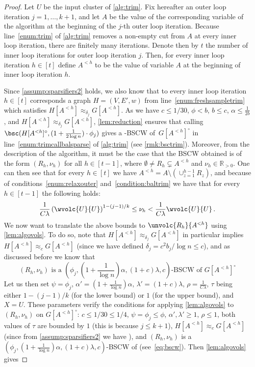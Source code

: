 \begin{proof}
	Let $U$ be the input cluster of \cref{alg:trim}. Fix hereafter an outer loop iteration $j=1,\dots, k+1$, and let $A$ be the value of the corresponding variable of the algorithm at the beginning of the $j$-th outer loop iteration. Because line~\eqref{enum:trim} of \cref{alg:trim} removes a non-empty cut from $A$ at every inner loop iteration, there are finitely many iterations. Denote then by $t$ the number of inner loop iterations for outer loop iteration $j$. Then, for every  inner loop iteration $h\in [t]$ define $A^{<h}$ to be the value of variable $A$ at the beginning of inner loop iteration $h$.
	
	Since \cref{assump:sparsifiers2} holds,  we also know that to every inner loop iteration $h \in [t]$ corresponds a graph $H=(V,E',w)$ from line~\eqref{enum:freshsampletrim} which satisfies $H[A^{<h}] \approx_{\delta_j} G[A^{<h}]$. As we have $c \le 1/30$, $\phi < b$, $b \le c$, $\alpha \le \frac{1}{2b}$,  and $H[A^{<h}] \approx_{\delta_j} G[A^{<h}]$, \cref{lem:reduction} ensures that calling $\bsc(H[A^{<h}]^\circ, (1+\frac{1}{2\log n}) \cdot \phi_j)$ gives a -BSCW of~$G[A^{<h}]^\circ$ in line~\eqref{enum:trimcallbalsparse} of \cref{alg:trim} (see \cref{rmk:bsctrim}). Moreover, from the description of the algorithm, it must be the case that the BSCW obtained is of the form $(R_h,\nu_h)$ for all $h \in [t-1]$, where $\emptyset \neq R_h \subsetneq A^{<h}$ and $\nu_h \in \mathbb{R}_{> 0}$. One can then see that for every $h \in [t]$ we have $A^{<h}=A \setminus (\cup_{z=1}^{h-1}R_z)$, and because of conditions~\eqref{enum:relaxouter} and~\eqref{condition:baltrim} we have that for every $h \in [t-1]$ the following holds:
	\begin{equation*}
		\frac{1}{C\lambda}\left(\wvolc{U}{U}\right)^{1-(j-1)/k} \le \nu_h < \frac{1}{C\lambda}\wvolc{U}{U} \, .
	\end{equation*}
	We now want to translate the above bounds to $\unvolc{R_h}{A^{<h}}$ using \cref{lem:algovols}. To do so, note that $H[A^{<h}] \approx_{\delta_j} G[A^{<h}]$ in particular implies $H[A^{<h}] \approx_{c} G[A^{<h}]$ (since we have defined $\delta_j=c^2 b_j/\log n \le c$), and as discussed before we know that
	\begin{equation}
		\label{eq:bscw}
		\text{$(R_h,\nu_h)$ is a $\left(\phi_j,\left(1+\frac{1}{\log n}\right)\alpha,(1+c)\lambda,c\right)$-BSCW of~$G[A^{<h}]^\circ$}
	\end{equation}
	Let us then set $\psi=\phi_j$, $ \alpha'=(1+\frac{1}{\log n})\alpha$, $\lambda' =(1+c)\lambda$, $\rho = \frac{1}{C\lambda}$, $\tau$ being either $1-(j-1)/k$ (for the lower bound) or $1$ (for the upper bound), and $X=U$. These parameters verify the conditions for applying \cref{lem:algovols} to $(R_h,\nu_h)$ on $G[A^{<h}]^\circ$: $c \le 1/30 \le 1/4$, $\psi =\phi_j\le \phi$, $\alpha',\lambda' \ge 1$, $\rho \le 1$, both values of $\tau$ are bounded by $1$ (this is because $j \le k+1$), $H[A^{<h}] \approx_{c} G[A^{<h}]$ (since from \cref{assump:sparsifiers2} we have ), and $(R_h,\nu_h)$ is a $(\phi_j,(1+\frac{1}{\log n})\alpha,(1+c)\lambda,c)$-BSCW of  (see~\eqref{eq:bscw}). Then \cref{lem:algovols} gives

\end{proof}
